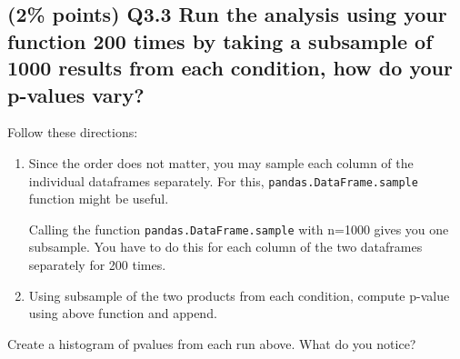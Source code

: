 \documentclass[11pt]{article}
\begin{document}
    \subsection{(2\% points) Q3.3 Run the analysis using your function 200
times by taking a subsample of 1000 results from each condition, how do
your p-values
vary?}\label{points-q3.3-run-the-analysis-using-your-function-200-times-by-taking-a-subsample-of-1000-results-from-each-condition-how-do-your-p-values-vary}

Follow these directions:

\begin{enumerate}
\def\labelenumi{\arabic{enumi}.}
\item
  Since the order does not matter, you may sample each column of the
  individual dataframes separately. For this,
  \texttt{pandas.DataFrame.sample} function might be useful.

  Calling the function \texttt{pandas.DataFrame.sample} with n=1000
  gives you one subsample. You have to do this for each column of the
  two dataframes separately for 200 times.
\item
  Using subsample of the two products from each condition, compute
  p-value using above function and append.
\end{enumerate}

Create a histogram of pvalues from each run above. What do you notice?
\end{document}
